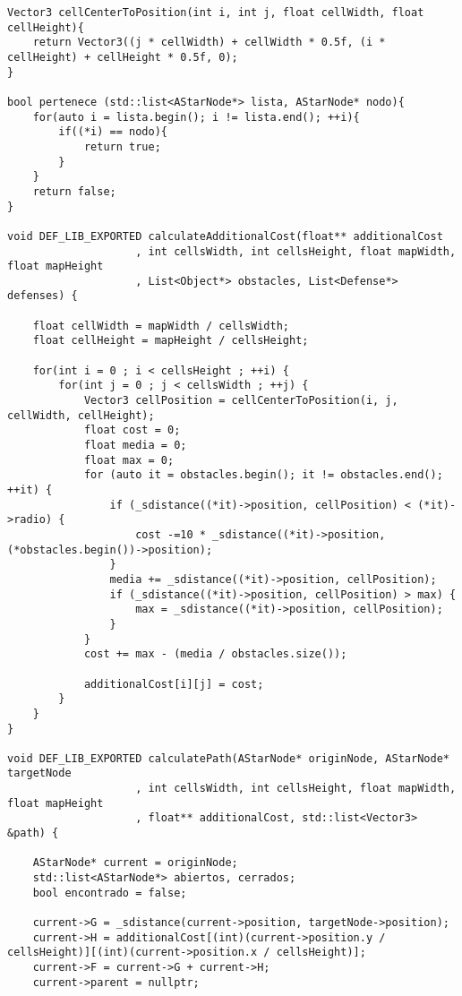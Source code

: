 \begin{lstlisting}
Vector3 cellCenterToPosition(int i, int j, float cellWidth, float cellHeight){ 
    return Vector3((j * cellWidth) + cellWidth * 0.5f, (i * cellHeight) + cellHeight * 0.5f, 0); 
}

bool pertenece (std::list<AStarNode*> lista, AStarNode* nodo){
    for(auto i = lista.begin(); i != lista.end(); ++i){
        if((*i) == nodo){
            return true;
        }
    }
    return false;
}

void DEF_LIB_EXPORTED calculateAdditionalCost(float** additionalCost
                    , int cellsWidth, int cellsHeight, float mapWidth, float mapHeight
                    , List<Object*> obstacles, List<Defense*> defenses) {

    float cellWidth = mapWidth / cellsWidth;
    float cellHeight = mapHeight / cellsHeight;

    for(int i = 0 ; i < cellsHeight ; ++i) {
        for(int j = 0 ; j < cellsWidth ; ++j) {
            Vector3 cellPosition = cellCenterToPosition(i, j, cellWidth, cellHeight);
            float cost = 0;
            float media = 0;
            float max = 0;
            for (auto it = obstacles.begin(); it != obstacles.end(); ++it) {
                if (_sdistance((*it)->position, cellPosition) < (*it)->radio) {
                    cost -=10 * _sdistance((*it)->position, (*obstacles.begin())->position);
                }
                media += _sdistance((*it)->position, cellPosition);
                if (_sdistance((*it)->position, cellPosition) > max) {
                    max = _sdistance((*it)->position, cellPosition);
                }
            }
            cost += max - (media / obstacles.size());
            
            additionalCost[i][j] = cost;
        }
    }
}

void DEF_LIB_EXPORTED calculatePath(AStarNode* originNode, AStarNode* targetNode
                    , int cellsWidth, int cellsHeight, float mapWidth, float mapHeight
                    , float** additionalCost, std::list<Vector3> &path) {

    AStarNode* current = originNode;
    std::list<AStarNode*> abiertos, cerrados;
    bool encontrado = false;

    current->G = _sdistance(current->position, targetNode->position);
    current->H = additionalCost[(int)(current->position.y / cellsHeight)][(int)(current->position.x / cellsHeight)];
    current->F = current->G + current->H;
    current->parent = nullptr;


\end{lstlisting}
